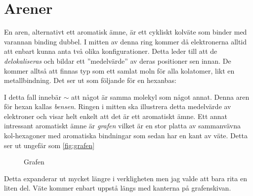 \section{Arener}
En aren, alternativt ett aromatisk ämne, är ett cykliskt kolväte som binder med varannan binding dubbel. I mitten av denna ring kommer då elektronerna alltid att enbart kunna anta två olika konfigurationer. Detta leder till att de \emph{delokaliseras} och bildar ett ''medelvärde'' av deras positioner sen innan. De kommer alltså att finnas typ som ett samlat moln för alla kolatomer, likt en metallbindning. Det ser ut som följande för en hexanbas:
\begin{figure*}[h]
    \centering
\end{figure*}

I detta fall innebär $\sim$ att något är samma molekyl som något annat. Denna aren för hexan kallas \emph{bensen}. Ringen i mitten ska illustrera detta medelvärde av elektroner och visar helt enkelt att det är ett aromatiskt ämne. Ett annat intressant aromatiskt ämne är \emph{grafen} vilket är en stor platta av sammanvävna kol-hexagoner med aromatiska bindningar som sedan har en kant av väte. Detta ser ut ungefär som \vref{fig:grafen}
\begin{figure*}[h]
    \centering
    \caption{Grafen}
    \label{fig:grafen}
\end{figure*}
Detta expanderar ut mycket längre i verkligheten men jag valde att bara rita en liten del. Väte kommer enbart uppstå längs med kanterna på grafenskivan.